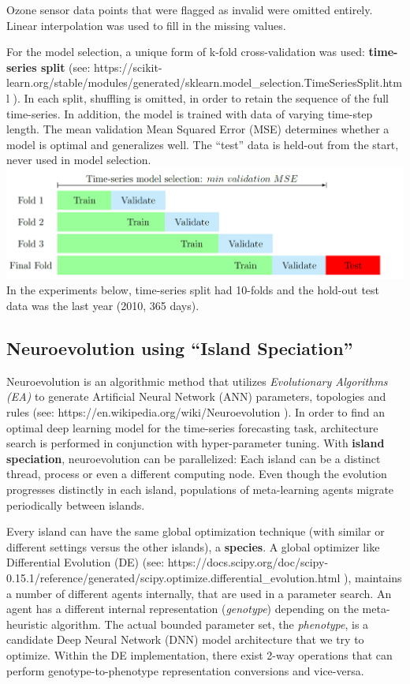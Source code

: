 \documentclass[11pt]{article}
\makeatletter
\def\maxwidth{\ifdim\Gin@nat@width>\linewidth\linewidth
    \else\Gin@nat@width\fi}
\let\Oldincludegraphics\includegraphics
\renewcommand{\includegraphics}[1]{\Oldincludegraphics[width=.8\maxwidth]{#1}}
\makeatother
\begin{document}
    Ozone sensor data points that were flagged as invalid were omitted
entirely. Linear interpolation was used to fill in the missing values.

For the model selection, a unique form of k-fold cross-validation was
used: \textbf{time-series split} (see:
https://scikit-learn.org/stable/modules/generated/sklearn.model\_selection.TimeSeriesSplit.html
). In each split, shuffling is omitted, in order to retain the sequence
of the full time-series. In addition, the model is trained with data of
varying time-step length. The mean validation Mean Squared Error (MSE)
determines whether a model is optimal and generalizes well. The ``test''
data is held-out from the start, never used in model selection.
\includegraphics{pics/timeSeriesValidateSplit.png} In the experiments
below, time-series split had 10-folds and the hold-out test data was the
last year (2010, 365 days).

    \hypertarget{neuroevolution-using-island-speciation}{%
\subsection{Neuroevolution using ``Island
Speciation''}\label{neuroevolution-using-island-speciation}}

Neuroevolution is an algorithmic method that utilizes \emph{Evolutionary
Algorithms (EA)} to generate Artificial Neural Network (ANN) parameters,
topologies and rules (see: https://en.wikipedia.org/wiki/Neuroevolution
). In order to find an optimal deep learning model for the time-series
forecasting task, architecture search is performed in conjunction with
hyper-parameter tuning. With \textbf{island speciation}, neuroevolution
can be parallelized: Each island can be a distinct thread, process or
even a different computing node. Even though the evolution progresses
distinctly in each island, populations of meta-learning agents migrate
periodically between islands.

Every island can have the same global optimization technique (with
similar or different settings versus the other islands), a
\textbf{species}. A global optimizer like Differential Evolution (DE)
(see:
https://docs.scipy.org/doc/scipy-0.15.1/reference/generated/scipy.optimize.differential\_evolution.html
), maintains a number of different agents internally, that are used in a
parameter search. An agent has a different internal representation
(\emph{genotype}) depending on the meta-heuristic algorithm. The actual
bounded parameter set, the \emph{phenotype}, is a candidate Deep Neural
Network (DNN) model architecture that we try to optimize. Within the DE
implementation, there exist 2-way operations that can perform
genotype-to-phenotype representation conversions and vice-versa.
\end{document}
